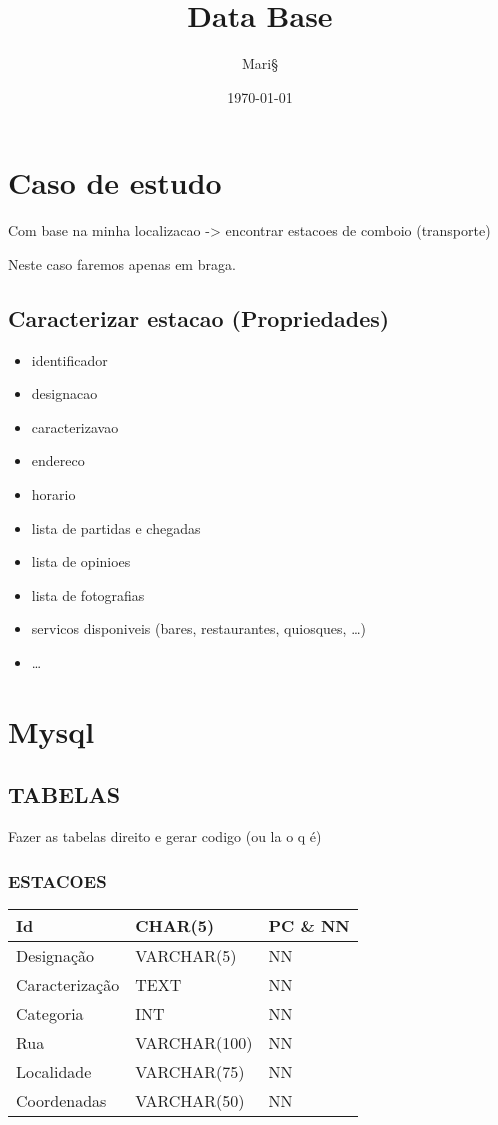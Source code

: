 \documentclass[11pt]{article}
\author{Mari§}
\date{\today}
\title{Data Base}
\begin{document}
\maketitle
\tableofcontents

\newpage
\section{Caso de estudo}
\label{sec:orgf2ee6a8}
Com base na minha localizacao -> encontrar estacoes de comboio (transporte)

Neste caso faremos apenas em braga.

\subsection{Caracterizar estacao (Propriedades)}
\label{sec:org86664be}
\begin{itemize}
\item identificador
\item designacao
\item caracterizavao
\item endereco
\item horario
\item lista de partidas e chegadas
\item lista de opinioes
\item lista de fotografias
\item servicos disponiveis (bares, restaurantes, quiosques, \ldots{})
\item \ldots{}
\end{itemize}

\newpage

\section{Mysql}
\label{sec:orgb771d8a}
\subsection{TABELAS}
\label{sec:org59b4924}
Fazer as tabelas direito e gerar codigo (ou la o q é)
\subsubsection{ESTACOES}
\label{sec:org909e4db}
\begin{center}
\begin{tabular}{lll}
\hline
Id & CHAR(5) & PC \& NN\\
\hline
Designação & VARCHAR(5) & NN\\
\hline
Caracterização & TEXT & NN\\
\hline
Categoria & INT & NN\\
\hline
Rua & VARCHAR(100) & NN\\
\hline
Localidade & VARCHAR(75) & NN\\
\hline
Coordenadas & VARCHAR(50) & NN\\
\hline
\end{tabular}
\end{center}
\end{document}
